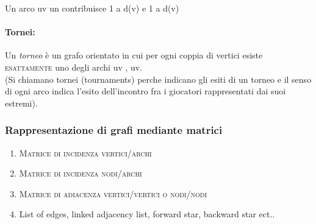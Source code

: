 Un arco uv un contribuisce 1 a d(v) e 1 a d(v)

\paragraph{Tornei:} Un \textit{torneo} è un grafo orientato in cui per ogni coppia di vertici esiste \textsc{esattamente} uno degli archi uv , uv. \\
(Si chiamano tornei (tournaments) perche indicano gli esiti di un torneo e il senso di ogni arco indica l'esito dell'incontro fra i giocatori rappresentati dai suoi estremi).

\subsubsection{Rappresentazione di grafi mediante matrici}
\begin{enumerate}
\item \textsc{Matrice di incidenza vertici/archi}
\item \textsc{Matrice di incidenza nodi/archi}
\item \textsc{Matrice di adiacenza vertici/vertici o nodi/nodi}
\item List of edges, linked adjacency list, forward star, backward star ect..
\end{enumerate}

\newpage